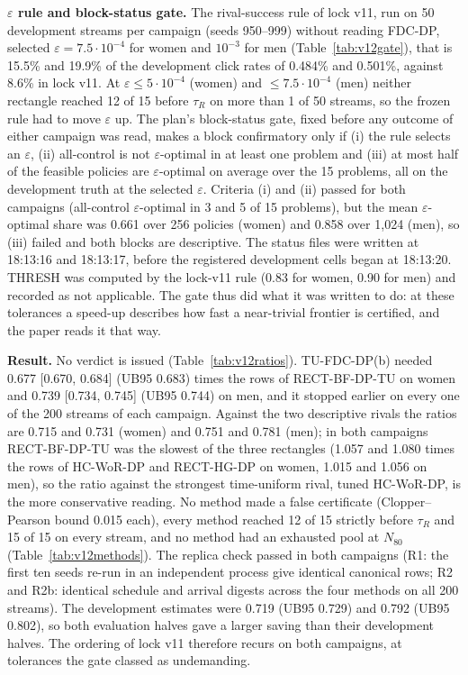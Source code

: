 \documentclass[sigconf,anonymous,review]{acmart}
\newcommand{\eps}{\varepsilon}
\begin{document}
\textbf{$\eps$ rule and block-status gate.} The rival-success rule of lock v11, run on 50 development streams per campaign (seeds 950--999) without reading FDC-DP, selected $\eps = 7.5 \cdot 10^{-4}$ for women and $10^{-3}$ for men (Table~\ref{tab:v12gate}), that is 15.5\% and 19.9\% of the development click rates of 0.484\% and 0.501\%, against 8.6\% in lock v11. At $\eps \le 5 \cdot 10^{-4}$ (women) and $\le 7.5 \cdot 10^{-4}$ (men) neither rectangle reached 12 of 15 before $\tau_R$ on more than 1 of 50 streams, so the frozen rule had to move $\eps$ up. The plan's block-status gate, fixed before any outcome of either campaign was read, makes a block confirmatory only if (i) the rule selects an $\eps$, (ii) all-control is not $\eps$-optimal in at least one problem and (iii) at most half of the feasible policies are $\eps$-optimal on average over the 15 problems, all on the development truth at the selected $\eps$. Criteria (i) and (ii) passed for both campaigns (all-control $\eps$-optimal in 3 and 5 of 15 problems), but the mean $\eps$-optimal share was 0.661 over 256 policies (women) and 0.858 over 1,024 (men), so (iii) failed and both blocks are descriptive. The status files were written at 18:13:16 and 18:13:17, before the registered development cells began at 18:13:20. THRESH was computed by the lock-v11 rule (0.83 for women, 0.90 for men) and recorded as not applicable. The gate thus did what it was written to do: at these tolerances a speed-up describes how fast a near-trivial frontier is certified, and the paper reads it that way.

\textbf{Result.} No verdict is issued (Table~\ref{tab:v12ratios}). TU-FDC-DP(b) needed 0.677 [0.670, 0.684] (UB95 0.683) times the rows of RECT-BF-DP-TU on women and 0.739 [0.734, 0.745] (UB95 0.744) on men, and it stopped earlier on every one of the 200 streams of each campaign. Against the two descriptive rivals the ratios are 0.715 and 0.731 (women) and 0.751 and 0.781 (men); in both campaigns RECT-BF-DP-TU was the slowest of the three rectangles (1.057 and 1.080 times the rows of HC-WoR-DP and RECT-HG-DP on women, 1.015 and 1.056 on men), so the ratio against the strongest time-uniform rival, tuned HC-WoR-DP, is the more conservative reading. No method made a false certificate (Clopper--Pearson bound 0.015 each), every method reached 12 of 15 strictly before $\tau_R$ and 15 of 15 on every stream, and no method had an exhausted pool at $N_{80}$ (Table~\ref{tab:v12methods}). The replica check passed in both campaigns (R1: the first ten seeds re-run in an independent process give identical canonical rows; R2 and R2b: identical schedule and arrival digests across the four methods on all 200 streams). The development estimates were 0.719 (UB95 0.729) and 0.792 (UB95 0.802), so both evaluation halves gave a larger saving than their development halves. The ordering of lock v11 therefore recurs on both campaigns, at tolerances the gate classed as undemanding.
\end{document}
